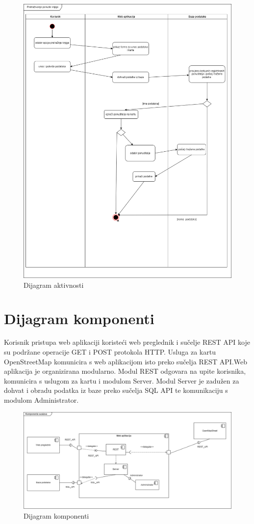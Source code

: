 			 \begin{figure}[H]
			 	\includegraphics[scale=0.4]{slike/4.4 dijagram aktivnosti.png} %
			 	\centering
			 	\caption{Dijagram aktivnosti}
			 	\label{fig:DijAkt}
			 \end{figure}
			
			\eject
		\section{Dijagram komponenti}
		
			Korisnik pristupa web aplikaciji koristeći web preglednik i sučelje REST API koje su podržane operacije GET i POST protokola HTTP. Usluga za kartu OpenStreetMap komunicira s web aplikacijom isto preko sučelja REST API.Web aplikacija je organizirana modularno. Modul REST odgovara na upite korisnika, komunicira s uslugom za kartu i modulom Server. Modul Server je zadužen za dohvat i obradu podatka iz baze preko sučelja SQL API te komunikaciju s modulom Administrator.
			
			\begin{figure}[H]
				\includegraphics[scale=0.4]{slike/4.5 dijagram komponenti.png} %
				\centering
				\caption{Dijagram komponenti}
				\label{fig:DijKomp}
			\end{figure}